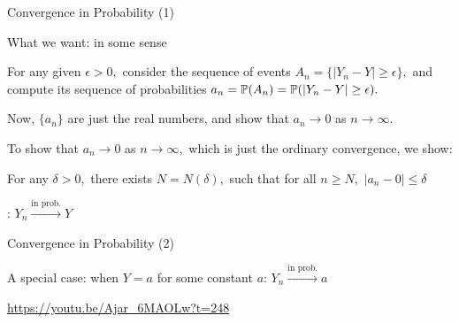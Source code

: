 \begin{frame}{Convergence in Probability (1)}

\plitemsep 0.05in

\bci

\item<1-> What we want:  in some sense

\item<2-> For any given $\epsilon >0,$ consider the sequence of events $A_n = \{|Y_n -Y| \geq \epsilon \},$ and compute its sequence of probabilities $a_n = \mathbb{P}( A_n ) = \mathbb{P}( |Y_n -Y| \geq \epsilon ).$

\item<3-> Now, $\{a_n\}$ are just the real numbers, and show that $a_n \rightarrow 0$ as $n \rightarrow \infty.$

\item<4-> To show that $a_n \rightarrow 0$ as $n \rightarrow \infty,$ which is just the ordinary convergence, we show:
\bci
\item<5-> For any $\delta >0,$ there exists $N = N(\delta),$ such that for all $n \geq N,$ $|a_n - 0 | \leq \delta$

\eci

\item<6-> : $Y_n \xrightarrow{\text{in prob.}} Y$

\eci
\end{frame}

\begin{frame}{Convergence in Probability (2)}


\plitemsep 0.1in

\bci

\item A special case: when $Y=a$ for some constant $a$: $Y_n \xrightarrow{\text{in prob.}} a$

\item \url{https://youtu.be/Ajar_6MAOLw?t=248}

\eci
\end{frame}


